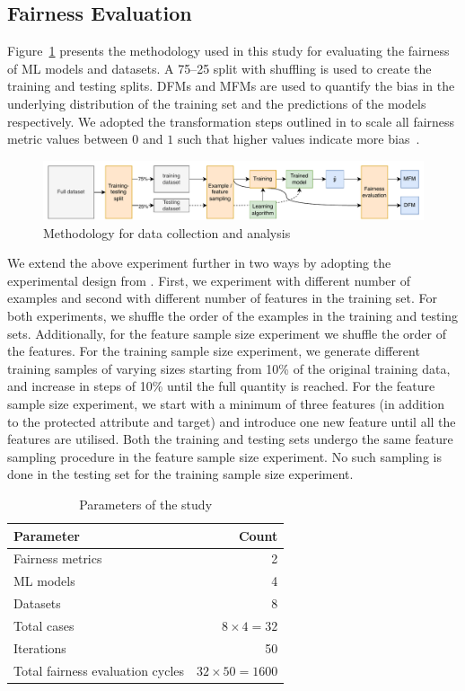 \documentclass{article}
\begin{document}
\subsection{Fairness Evaluation}\label{sec:method-fair-eval}

Figure \ref{fig:method} presents the methodology used in this study
for evaluating the fairness of ML models and datasets. A 75--25 split
with shuffling is used to create the training and testing splits. DFMs
and MFMs are used to quantify the bias in the underlying distribution
of the training set and the predictions of the models respectively. We
adopted the transformation steps outlined in
\citeauthor{zhang2021ignorance} to scale all fairness metric values
between $0$ and $1$ such that higher values indicate more
bias \cite{zhang2021ignorance}.

\begin{figure}
  \centering
  \includegraphics[width=0.95\linewidth]{method.pdf}
  \caption{Methodology for data collection and analysis}
  \label{fig:method}
\end{figure}

We extend the above experiment further in two ways by adopting the
experimental design from \citeauthor{zhang2021ignorance}. First, we
experiment with different number of examples and second with different
number of features in the training set. For both experiments, we
shuffle the order of the examples in the training and testing
sets. Additionally, for the feature sample size experiment we shuffle
the order of the features. For the training sample size experiment, we
generate different training samples of varying sizes starting from
10\% of the original training data, and increase in steps of 10\%
until the full quantity is reached. For the feature sample size
experiment, we start with a minimum of three features (in addition to
the protected attribute and target) and introduce one new feature
until all the features are utilised. Both the training and testing
sets undergo the same feature sampling procedure in the feature sample
size experiment. No such sampling is done in the testing set for the
training sample size experiment.

\begin{table}
  \centering
  \begin{tabular}{l r}
    \toprule
    \textbf{Parameter} & \textbf{Count}\\
    \midrule
    Fairness metrics & 2\\
    ML models & 4\\
    Datasets & 8\\
    Total cases & $8\times4=32$\\
    Iterations & 50\\
    Total fairness evaluation cycles & $32\times50=1600$\\
    \bottomrule
  \end{tabular}
  \caption{Parameters of the study}
  \label{tab:parameters}
\end{table}
\end{document}
